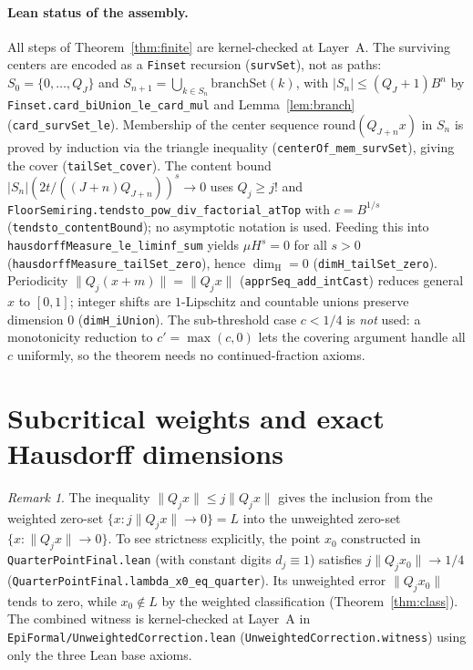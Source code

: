 \documentclass[11pt]{article}
\theoremstyle{definition}
\theoremstyle{remark}
\newtheorem{remark}[theorem]{Remark}
\newcommand{\dimH}{\dim_{\mathrm{H}}}
\begin{document}
\paragraph{Lean status of the assembly.} All steps of Theorem~\ref{thm:finite}
are kernel-checked at Layer~A. The surviving centers are encoded as a
\texttt{Finset} recursion (\texttt{survSet}), not as paths:
$S_0=\{0,\dots,Q_J\}$ and $S_{n+1}=\bigcup_{k\in S_n}\mathrm{branchSet}(k)$,
with $|S_n|\le(Q_J+1)B^n$ by \texttt{Finset.card\_biUnion\_le\_card\_mul} and
Lemma~\ref{lem:branch} (\texttt{card\_survSet\_le}). Membership of the center
sequence $\mathrm{round}(Q_{J+n}x)$ in $S_n$ is proved by induction via the
triangle inequality (\texttt{centerOf\_mem\_survSet}), giving the cover
(\texttt{tailSet\_cover}). The content bound
$|S_n|(2t/((J+n)Q_{J+n}))^s\to0$ uses $Q_j\ge j!$ and
\texttt{FloorSemiring.\allowbreak tendsto\_pow\_div\_factorial\_atTop} with
$c=B^{1/s}$ (\texttt{tendsto\_contentBound}); no asymptotic notation is used.
Feeding this into \texttt{hausdorffMeasure\_le\_liminf\_sum} yields
$\mu H^s=0$ for all $s>0$ (\texttt{hausdorffMeasure\_tailSet\_zero}), hence
$\dimH=0$ (\texttt{dimH\_tailSet\_zero}). Periodicity
$\|Q_j(x+m)\|=\|Q_jx\|$ (\texttt{apprSeq\_add\_intCast}) reduces general $x$ to
$[0,1]$; integer shifts are $1$-Lipschitz and countable unions preserve
dimension $0$ (\texttt{dimH\_iUnion}). The sub-threshold case $c<1/4$ is
\emph{not} used: a monotonicity reduction to $c'=\max(c,0)$ lets the covering
argument handle all $c$ uniformly, so the theorem needs no continued-fraction
axioms.

\section{Subcritical weights and exact Hausdorff dimensions}\label{sec:weights}

\begin{remark}\label{rem:unweighted}
The inequality $\|Q_jx\|\le j\|Q_jx\|$ gives the inclusion from the
weighted zero-set $\{x:j\|Q_jx\|\to0\}=L$ into the unweighted zero-set
$\{x:\|Q_jx\|\to0\}$. To see strictness explicitly, the point $x_0$ constructed
in \texttt{QuarterPointFinal.lean} (with constant digits $d_j\equiv1$) satisfies
$j\|Q_jx_0\|\to1/4$ (\texttt{QuarterPointFinal.\allowbreak lambda\_x0\_eq\_quarter}).
Its unweighted error $\|Q_jx_0\|$ tends to zero, while $x_0\notin L$ by the
weighted classification (Theorem~\ref{thm:class}). The combined witness is
kernel-checked at Layer~A in \texttt{EpiFormal/\allowbreak UnweightedCorrection.lean}
(\texttt{UnweightedCorrection.\allowbreak witness}) using only the three Lean
base axioms.
\end{remark}
\end{document}
